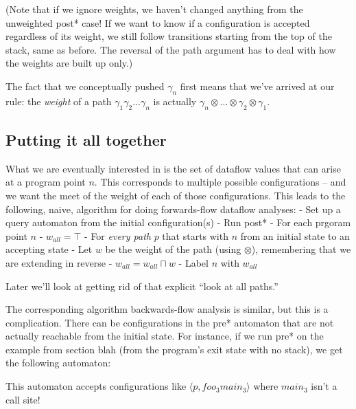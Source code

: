 \documentclass{article}
\newcommand{\Config}[2]{\ensuremath{\langle #1, #2 \rangle}}
\newcommand{\meet}{\sqcap}
\newcommand{\extend}{\otimes}
\begin{document}
(Note that if we ignore weights, we haven't changed anything from the
unweighted post* case! If we want to know if a configuration is
accepted regardless of its weight\footnotemark, we still follow
transitions starting from the top of the stack, same as before. The
reversal of the path argument has to deal with how the weights are
built up only.)

The fact that we conceptually pushed $\gamma_n$ first means that we've
arrived at our rule: the \emph{weight} of a path $\gamma_1 \gamma_2
\dots \gamma_n$ is actually $\gamma_n \extend \dots \extend \gamma_2
\extend \gamma_1$.







\subsection{Putting it all together}

What we are eventually interested in is the set of dataflow
values that can arise at a program point $n$. This corresponds to
multiple possible configurations -- and we want the meet of the weight
of each of those configurations. This leads to the following, naive,
algorithm for doing forwards-flow dataflow analyses:
    - Set up a query automaton from the initial configuration(s)
    - Run post*
    - For each prgoram point $n$
          - $w_{all} = \top$
          - For \emph{every path} $p$ that starts with $n$ from an
            initial state to an accepting state
              - Let $w$ be the weight of the path (using $\extend$),
                remembering that we are extending in reverse
              - $w_{all} = w_{all} \meet w$
          - Label $n$ with $w_{all}$

Later we'll look at getting rid of that explicit ``look at all
paths.''

The corresponding algorithm backwards-flow analysis is similar, but
this is a complication. There can be configurations in the pre*
automaton that are not actually reachable from the initial state. For
instance, if we run pre* on the example from section blah (from the
program's exit state with no stack), we get the following automaton:

This automaton accepts configurations like \Config{p}{foo_3 main_3}
where $main_3$ isn't a call site!
\end{document}
